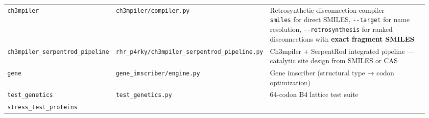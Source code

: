 \begin{longtable}[]{@{}lll@{}}
\begin{minipage}[t]{0.24\columnwidth}
\texttt{ch3mpiler}\strut
\end{minipage} & \begin{minipage}[t]{0.24\columnwidth}\raggedright
\texttt{ch3mpiler/compiler.py}\strut
\end{minipage} & \begin{minipage}[t]{0.43\columnwidth}\raggedright
Retrosynthetic disconnection compiler --- \texttt{-\/-smiles} for direct
SMILES, \texttt{-\/-target} for name resolution,
\texttt{-\/-retrosynthesis} for ranked disconnections with \textbf{exact
fragment SMILES}\strut
\end{minipage}\tabularnewline
\begin{minipage}[t]{0.24\columnwidth}\raggedright
\texttt{ch3mpiler\_serpentrod\_pipeline}\strut
\end{minipage} & \begin{minipage}[t]{0.24\columnwidth}\raggedright
\texttt{rhr\_p4rky/ch3mpiler\_serpentrod\_pipeline.py}\strut
\end{minipage} & \begin{minipage}[t]{0.43\columnwidth}\raggedright
Ch3mpiler + SerpentRod integrated pipeline --- catalytic site design
from SMILES or CAS\strut
\end{minipage}\tabularnewline
\begin{minipage}[t]{0.24\columnwidth}\raggedright
\texttt{gene}\strut
\end{minipage} & \begin{minipage}[t]{0.24\columnwidth}\raggedright
\texttt{gene\_imscriber/engine.py}\strut
\end{minipage} & \begin{minipage}[t]{0.43\columnwidth}\raggedright
Gene imscriber (structural type → codon optimization)\strut
\end{minipage}\tabularnewline
\begin{minipage}[t]{0.24\columnwidth}\raggedright
\texttt{test\_genetics}\strut
\end{minipage} & \begin{minipage}[t]{0.24\columnwidth}\raggedright
\texttt{test\_genetics.py}\strut
\end{minipage} & \begin{minipage}[t]{0.43\columnwidth}\raggedright
64-codon B4 lattice test suite\strut
\end{minipage}\tabularnewline
\begin{minipage}[t]{0.24\columnwidth}\raggedright
\texttt{stress\_test\_proteins}\strut
\end{minipage} & \begin{minipage}[t]{0.24\columnwidth}\raggedright

\end{minipage}
\end{longtable}

